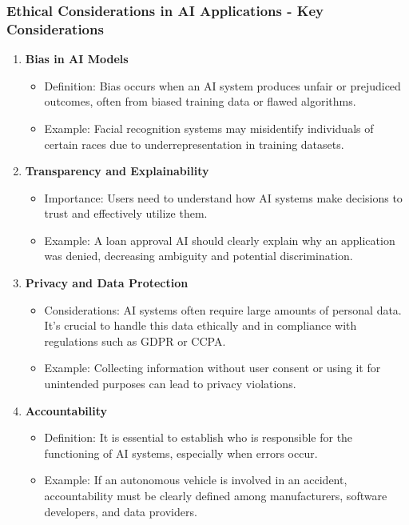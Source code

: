 \documentclass{beamer}
\begin{document}
\begin{frame}[fragile]
    \frametitle{Ethical Considerations in AI Applications - Key Considerations}
    \begin{enumerate}
        \item \textbf{Bias in AI Models}
        \begin{itemize}
            \item Definition: Bias occurs when an AI system produces unfair or prejudiced outcomes, often from biased training data or flawed algorithms.
            \item Example: Facial recognition systems may misidentify individuals of certain races due to underrepresentation in training datasets.
        \end{itemize}
        
        \item \textbf{Transparency and Explainability}
        \begin{itemize}
            \item Importance: Users need to understand how AI systems make decisions to trust and effectively utilize them.
            \item Example: A loan approval AI should clearly explain why an application was denied, decreasing ambiguity and potential discrimination.
        \end{itemize}
        
        \item \textbf{Privacy and Data Protection}
        \begin{itemize}
            \item Considerations: AI systems often require large amounts of personal data. It’s crucial to handle this data ethically and in compliance with regulations such as GDPR or CCPA.
            \item Example: Collecting information without user consent or using it for unintended purposes can lead to privacy violations.
        \end{itemize}
        
        \item \textbf{Accountability}
        \begin{itemize}
            \item Definition: It is essential to establish who is responsible for the functioning of AI systems, especially when errors occur.
            \item Example: If an autonomous vehicle is involved in an accident, accountability must be clearly defined among manufacturers, software developers, and data providers.
        \end{itemize}
        

\end{enumerate}
\end{frame}
\end{document}
